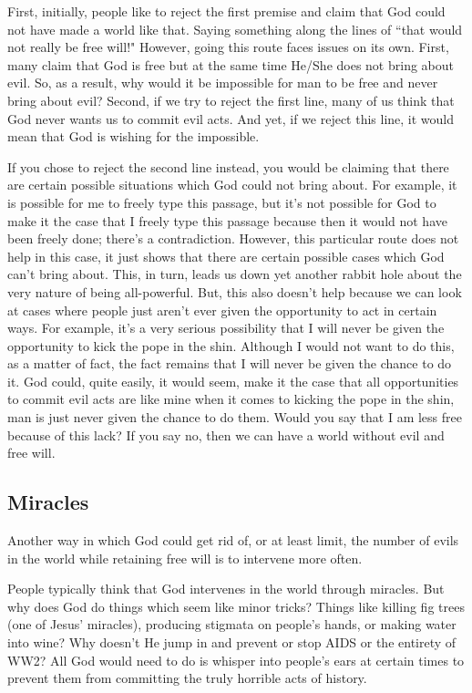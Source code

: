 First, initially, people like to reject the first premise and claim that God could not have made a world like that. Saying something along the lines of ``that would not really be free will!" However, going this route faces issues on its own. First, many claim that God is free but at the same time He/She does not bring about evil. So, as a result, why would it be impossible for man to be free and never bring about evil? Second, if we try to reject the first line, many of us think that God never wants us to commit evil acts. And yet, if we reject this line, it would mean that God is wishing for the impossible.

If you chose to reject the second line instead, you would be claiming that there are certain possible situations which God could not bring about. For example, it is possible for me to freely type this passage, but it's not possible for God to make it the case that I freely type this passage because then it would not have been freely done; there's a contradiction. However, this particular route does not help in this case, it just shows that there are certain possible cases which God can't bring about. This, in turn, leads us down yet another rabbit hole about the very nature of being all-powerful. But, this also doesn't help because we can look at cases where people just aren't ever given the opportunity to act in certain ways. For example, it's a very serious possibility that I will never be given the opportunity to kick the pope in the shin. Although I would not want to do this, as a matter of fact, the fact remains that I will never be given the chance to do it. God could, quite easily, it would seem, make it the case that all opportunities to commit evil acts are like mine when it comes to kicking the pope in the shin, man is just never given the chance to do them. Would you say that I am less free because of this lack? If you say no, then we can have a world without evil and free will.

\subsection{Miracles}

Another way in which God could get rid of, or at least limit, the number of evils in the world while retaining free will is to intervene more often.

People typically think that God intervenes in the world through miracles. But why does God do things which seem like minor tricks? Things like killing fig trees (one of Jesus’ miracles), producing stigmata on people’s hands, or making water into wine? Why doesn’t He jump in and prevent or stop AIDS or the entirety of WW2? All God would need to do is whisper into people's ears at certain times to prevent them from committing the truly horrible acts of history.

